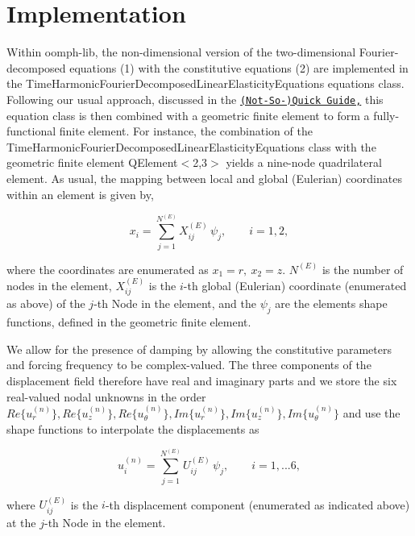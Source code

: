  

\hypertarget{index_element_types}{}\section{Implementation}\label{index_element_types}
Within {\ttfamily oomph-\/lib}, the non-\/dimensional version of the two-\/dimensional Fourier-\/decomposed equations (1) with the constitutive equations (2) are implemented in the {\ttfamily Time\+Harmonic\+Fourier\+Decomposed\+Linear\+Elasticity\+Equations} equations class. Following our usual approach, discussed in the \href{../../../quick_guide/html/index.html}{\tt (Not-\/\+So-\/)Quick Guide,} this equation class is then combined with a geometric finite element to form a fully-\/functional finite element. For instance, the combination of the {\ttfamily Time\+Harmonic\+Fourier\+Decomposed\+Linear\+Elasticity\+Equations} class with the geometric finite element {\ttfamily Q\+Element$<$2,3$>$} yields a nine-\/node quadrilateral element. As usual, the mapping between local and global (Eulerian) coordinates within an element is given by, \begin{center} \[ x_i = \sum_{j=1}^{N^{(E)}} X^{(E)}_{ij} \, \psi_j, \qquad i=1,2, \] \end{center}  where the coordinates are enumerated as $ x_1=r, \ x_2 = z$. $ N^{(E)} $ is the number of nodes in the element, $ X^{(E)}_{ij} $ is the $ i $-\/th global (Eulerian) coordinate (enumerated as above) of the $ j $-\/th {\ttfamily Node} in the element, and the $ \psi_j $ are the element\textquotesingle{}s shape functions, defined in the geometric finite element.

We allow for the presence of damping by allowing the constitutive parameters and forcing frequency to be complex-\/valued. The three components of the displacement field therefore have real and imaginary parts and we store the six real-\/valued nodal unknowns in the order $ Re\{u_r^{(n)}\}, Re\{u_z^{(n)}\}, Re\{u_\theta^{(n)}\}, Im\{u_r^{(n)}\}, Im\{u_z^{(n)}\}, Im\{u_\theta^{(n)}\} $ and use the shape functions to interpolate the displacements as \begin{center} \[ u_i^{(n)} = \sum_{j=1}^{N^{(E)}} U^{(E)}_{ij} \, \psi_j, \qquad i=1,...6, \] \end{center}  where $ U^{(E)}_{ij} $ is the $ i $-\/th displacement component (enumerated as indicated above) at the $ j $-\/th {\ttfamily Node} in the element.



 

